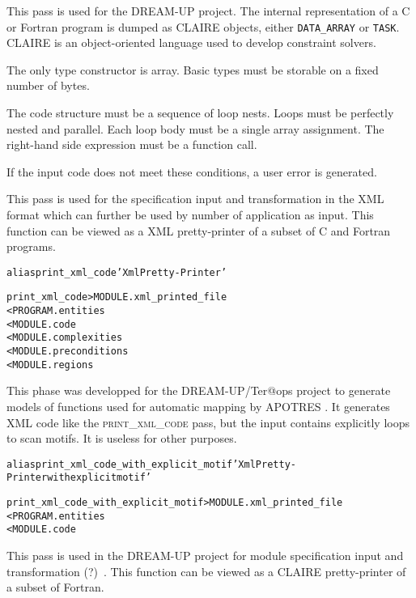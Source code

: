 \documentclass[a4paper]{report}
\newenvironment{PipsMake}{\begin{alltt}}{\end{alltt}}
\newenvironment{PipsPass}[1]{\label{pass:#1}}{}
\begin{document}
This pass is used for the DREAM-UP project. The internal representation of
a C or Fortran program is dumped as CLAIRE objects, either
\texttt{DATA\_ARRAY} or \texttt{TASK}. CLAIRE is an object-oriented
language used to develop constraint solvers.

The only type constructor is array. Basic types must be storable on a
fixed number of bytes.

The code structure must be a sequence of loop nests. Loops must be
perfectly nested and parallel. Each loop body must be a single array
assignment. The right-hand side expression must be a function call.

If the input code does not meet these conditions, a user error is generated.

\begin{PipsPass}{print_xml_code}
This pass is used for the specification input and transformation in the XML format which can further be used by number of application as input. This function can be viewed as a XML pretty-printer of a subset of C and Fortran programs.
\end{PipsPass}

\begin{PipsMake}
alias print_xml_code 'Xml Pretty-Printer'

print_xml_code      > MODULE.xml_printed_file
    < PROGRAM.entities
    < MODULE.code
    < MODULE.complexities
    < MODULE.preconditions
    < MODULE.regions
\end{PipsMake}

\begin{PipsPass}{print_xml_code_with_explicit_motif}
This phase was developped for the DREAM-UP/Ter@ops project to generate models
of functions used for automatic mapping by APOTRES \cite{}. It
generates XML code like the \textsc{print\_xml\_code} pass, but the
input contains explicitly loops to scan motifs. It is useless for
other purposes. 
\end{PipsPass}

\begin{PipsMake}
alias print_xml_code_with_explicit_motif 'Xml Pretty-Printer with explicit motif'

print_xml_code_with_explicit_motif       > MODULE.xml_printed_file
        < PROGRAM.entities
    < MODULE.code
\end{PipsMake}

\begin{PipsPass}{print_claire_code}
This pass is used in the DREAM-UP project for module specification
input and transformation (?)~\cite{}. This function can be viewed as a
CLAIRE pretty-printer of a subset of Fortran.
\end{PipsPass}
\end{document}
